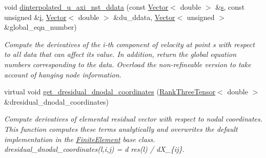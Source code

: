 \begin{DoxyCompactItemize}
void \hyperlink{classoomph_1_1RefineableGeneralisedNewtonianAxisymmetricNavierStokesEquations_a36b7f19e66187a7b0fef8e0134e716f4}{dinterpolated\+\_\+u\+\_\+axi\+\_\+nst\+\_\+ddata} (const \hyperlink{classoomph_1_1Vector}{Vector}$<$ double $>$ \&\hyperlink{cfortran_8h_ab7123126e4885ef647dd9c6e3807a21c}{s}, const unsigned \&\hyperlink{cfortran_8h_adb50e893b86b3e55e751a42eab3cba82}{i}, \hyperlink{classoomph_1_1Vector}{Vector}$<$ double $>$ \&du\+\_\+ddata, \hyperlink{classoomph_1_1Vector}{Vector}$<$ unsigned $>$ \&global\+\_\+eqn\+\_\+number)
\begin{DoxyCompactList}\small\item\em Compute the derivatives of the i-\/th component of velocity at point s with respect to all data that can affect its value. In addition, return the global equation numbers corresponding to the data. Overload the non-\/refineable version to take account of hanging node information. \end{DoxyCompactList}\item 
virtual void \hyperlink{classoomph_1_1RefineableGeneralisedNewtonianAxisymmetricNavierStokesEquations_a6f99de802883fc8b4cf3fbcbf3e342d0}{get\+\_\+dresidual\+\_\+dnodal\+\_\+coordinates} (\hyperlink{classoomph_1_1RankThreeTensor}{Rank\+Three\+Tensor}$<$ double $>$ \&dresidual\+\_\+dnodal\+\_\+coordinates)
\begin{DoxyCompactList}\small\item\em Compute derivatives of elemental residual vector with respect to nodal coordinates. This function computes these terms analytically and overwrites the default implementation in the \hyperlink{classoomph_1_1FiniteElement}{Finite\+Element} base class. dresidual\+\_\+dnodal\+\_\+coordinates(l,i,j) = d res(l) / d\+X\+\_\+\{ij\}. \end{DoxyCompactList}\end{DoxyCompactItemize}
